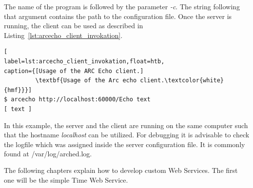 %
%
The name of the program is followed by the parameter \textit{-c}.
The string following that argument contains the path to the configuration file.
Once the server is running, the client can be used as described in Listing~\ref{lst:arcecho_client_invokation}.
\begin{lstlisting}[
label=lst:arcecho_client_invokation,float=htb,
caption={[Usage of the ARC Echo client.]
         \textbf{Usage of the Arc echo client.\textcolor{white}{hmf}}}]
$ arcecho http://localhost:60000/Echo text
[ text ]
\end{lstlisting}

In this example, the server and the client are running on the same computer such that the hostname \textit{localhost} can be utilized. 
For debugging it is advisable to check the logfile which was assigned inside the server configuration file.
It is commonly found at /var/log/arched.log.

The following chapters explain how to develop custom Web Services.
The first one will be the simple Time Web Service.












